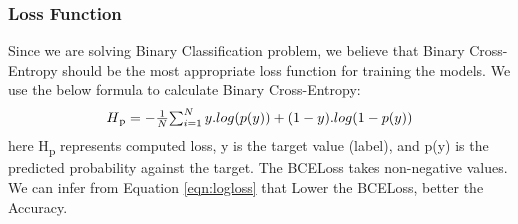 \subsubsection{Loss Function}
Since we are solving Binary Classification problem, we believe that Binary Cross-Entropy should be the most appropriate 
loss function for training the models. We use the below formula to calculate Binary Cross-Entropy:
  \begin{equation}
      \begin{array}{l}
        H\textsubscript{p} = - \frac{1}{N}$$\sum_{i=1}^{N}y.log(p(y))+
        (1- y).log(1-p(y))
      \end{array}
    \label{eqn:logloss}
  \end{equation}
here H\textsubscript{p} represents computed loss, y is the target value (label), and p(y) 
is the predicted probability against the target. The BCELoss takes non-negative values. We can infer 
from Equation \ref{eqn:logloss} that Lower the BCELoss, better the Accuracy.
